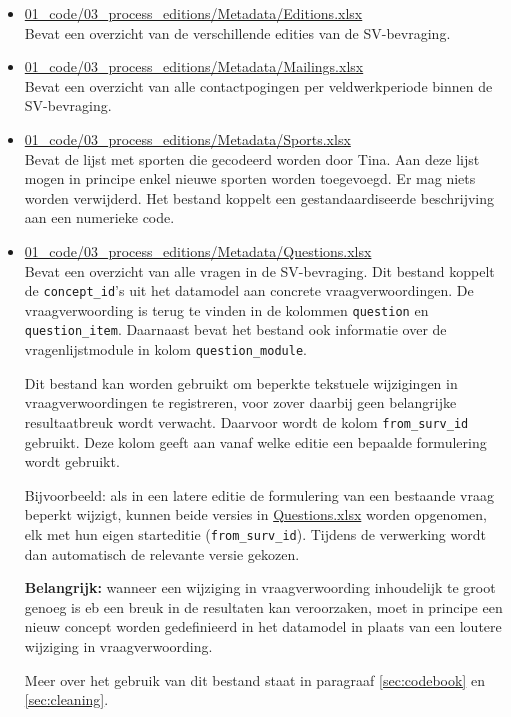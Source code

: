 \documentclass{VSAnote}
\begin{document}
\begin{itemize}

\item \url{01_code/03_process_editions/Metadata/Editions.xlsx}\\
Bevat een overzicht van de verschillende edities van de SV-bevraging.

\item \url{01_code/03_process_editions/Metadata/Mailings.xlsx}\\
Bevat een overzicht van alle contactpogingen per veldwerkperiode binnen de SV-bevraging.

\item \url{01_code/03_process_editions/Metadata/Sports.xlsx}\\
Bevat de lijst met sporten die gecodeerd worden door Tina. Aan deze lijst mogen in principe enkel nieuwe sporten worden toegevoegd. Er mag niets worden verwijderd. Het bestand koppelt een gestandaardiseerde beschrijving aan een numerieke code.

\item \url{01_code/03_process_editions/Metadata/Questions.xlsx}\\
Bevat een overzicht van alle vragen in de SV-bevraging. Dit bestand koppelt de \verb+concept_id+'s uit het datamodel aan concrete vraagverwoordingen. De vraagverwoording is terug te vinden in de kolommen \verb+question+ en \verb+question_item+. Daarnaast bevat het bestand ook informatie over de vragenlijstmodule in kolom \verb+question_module+.

Dit bestand kan worden gebruikt om beperkte tekstuele wijzigingen in vraagverwoordingen te registreren, voor zover daarbij geen belangrijke resultaatbreuk wordt verwacht. Daarvoor wordt de kolom \verb+from_surv_id+ gebruikt. Deze kolom geeft aan vanaf welke editie een bepaalde formulering wordt gebruikt.

Bijvoorbeeld: als in een latere editie de formulering van een bestaande vraag beperkt wijzigt, kunnen beide versies in \url{Questions.xlsx} worden opgenomen, elk met hun eigen starteditie (\verb+from_surv_id+). Tijdens de verwerking wordt dan automatisch de relevante versie gekozen.

\textbf{Belangrijk:} wanneer een wijziging in vraagverwoording inhoudelijk te groot genoeg is eb een breuk in de resultaten kan veroorzaken, moet in principe een nieuw concept worden gedefinieerd in het datamodel in plaats van een loutere wijziging in vraagverwoording.

Meer over het gebruik van dit bestand staat in paragraaf \ref{sec:codebook} en \ref{sec:cleaning}.


\end{itemize}
\end{document}

